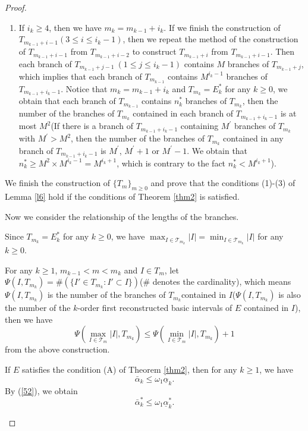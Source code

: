 \documentclass[reqno]{amsart}
\theoremstyle{plain}
\theoremstyle{definition}
\theoremstyle{remark}
\numberwithin{equation}{section} \DeclareMathOperator\intr{int}
\begin{document}
\begin{proof}
\begin{enumerate}
\begin{enumerate}
\item[\textup{(e)}]If $i_k\ge 4$, then we have $m_k=m_{k-1}+i_k$. If we finish the construction of $T_{m_{k-1}+i-1}(3\le i\le i_k-1)$,  then we repeat the method of the construction of $T_{m_{k-1}+i-1}$ from $T_{m_{k-1}+i-2}$ to construct $T_{m_{k-1}+i}$ from $T_{m_{k-1}+i-1}$. Then each branch of $T_{m_{k-1}+j-1}\ (1\le j\le i_{k}-1)$ contains $M$ branches of $T_{m_{k-1}+j}$, which implies that each branch of $T_{m_{k-1}}$ contains $M^{i_{k}-1}$ branches of $T_{m_{k-1}+i_{k}-1}$.
    Notice that  $m_k=m_{k-1}+i_k$ and $T_{m_{k}}=E_{k}^{*}$ for any $k\ge 0$, we  obtain  that each branch of $T_{m_{k-1}}$ contains $n_k^{*}$ branches of $T_{m_{k}}$, then the number of the branches of $T_{m_{k}}$ contained in each branch of $T_{m_{k-1}+i_{k}-1}$ is at most $M^{2}$(If  there is a branch of $T_{m_{k-1}+i_{k}-1}$ containing $M^{'}$ branches of $T_{m_{k}}$ with $M^{'}>M^{2}$, then
    the number of the branches of $T_{m_{k}}$ contained in any branch of $T_{m_{k-1}+i_{k}-1}$
    is $M^{'}$, $M^{'}+1$ or $M^{'}-1$. We obtain that $n_{k}^{*}\ge M^{2}\times M^{i_{k}-1}=M^{i_k+1}$, which is contrary to the fact $ n_k^{*}<M^{i_k+1}$).

\end{enumerate}

    We finish the construction of $\{T_{m}\}_{m\ge 0}$ and prove that the conditions (1)-(3) of Lemma \ref{l6}  hold if the conditions of Theorem \ref{thm2} is satisfied.

Now we consider the relationship of the lengths of the branches.

Since $T_{m_{k}}=E_{k}^{*}$ for any $k\ge 0$, we have $\max_{I\in\mathcal{T}_{m_{k}}}\left|I\right|= \min_{I\in\mathcal{T}_{m_{k}}}\left|I\right|$ for any $k \ge 0$.

For any $k\ge 1$, $m_{k-1}< m <m_k$ and $I\in T_m$, let
$\Psi (I,T_{m_{k}})=\#(\{I'\in T_{m_{k}}: I'\subset I\})$($\#$ denotes the cardinality),  which  means $\Psi (I,T_{m_{k}}) $ is the number of the branches of $T_{m_{k}}$contained in $I$($\Psi (I,T_{m_{k}}) $ is also the number of the  $k$-order first reconstructed basic intervals of $E$ contained in $I$),
then we have \begin{equation}\label{61}\Psi (\max_{I\in\mathcal{T}_{m} }\left | I \right |,T_{m_{k}})\le \Psi (\min_{I\in\mathcal{T}_{m} }\left | I \right |,T_{m_{k}})+1\end{equation} from the above construction.

If  $E$ satisfies the condition (A) of Theorem \ref{thm2}, then for any $k\ge 1$, we have
\begin{equation}
\bar\alpha_k\le  \omega_{1}\underline\alpha_k.\nonumber
\end{equation}
By (\ref{52}), we obtain
\begin{equation}\label{62}
\bar\alpha^*_k\le \omega_{1} \underline\alpha^*_k.
\end{equation}


\end{enumerate}
\end{proof}
\end{document}
